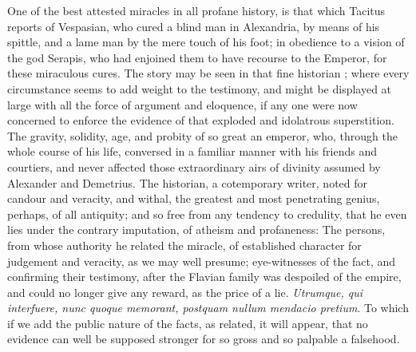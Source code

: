 \documentclass[]{article}
\newcounter{authornote}[page]
\newcommand*{\authornote}[1]{\renewcommand{\thefootnote}{\fnsymbol{footnote}}\stepcounter{authornote}\footnote[\value{authornote}]{#1}\renewcommand{\thefootnote}{\arabic{footnote}}}
\begin{document}
\begin{sectionbody}
\humeparagraph  One of the best attested miracles in all profane history, is that which Tacitus reports of Vespasian, who cured a blind man in Alexandria, by means of his spittle, and a lame man by the mere touch of his foot; in obedience to a vision of the god Serapis, who had enjoined them to have recourse to the Emperor, for these miraculous cures. The story may be seen in that fine historian%
; where every circumstance seems to add weight to the testimony, and might be displayed at large with all the force of argument and eloquence, if any one were now concerned to enforce the evidence of that exploded and idolatrous superstition. The gravity, solidity, age, and probity of so great an emperor, who, through the whole course of his life, conversed in a familiar manner with his friends and courtiers, and never affected those extraordinary airs of divinity assumed by Alexander and Demetrius. The historian, a cotemporary writer, noted for candour and veracity, and withal, the greatest and most penetrating genius, perhaps, of all antiquity; and so free from any tendency to credulity, that he even lies under the contrary imputation, of atheism and profaneness: The persons, from whose authority he related the miracle, of established character for judgement and veracity, as we may well presume; eye-witnesses of the fact, and confirming their testimony, after the Flavian family was despoiled of the empire, and could no longer give any reward, as the price of a lie. \emph{Utrumque, qui interfuere, nunc quoque memorant, postquam nullum mendacio pretium}. To which if we add the public nature of the facts, as related, it will appear, that no evidence can well be supposed stronger for so gross and so palpable a falsehood.


\end{sectionbody}
\end{document}
